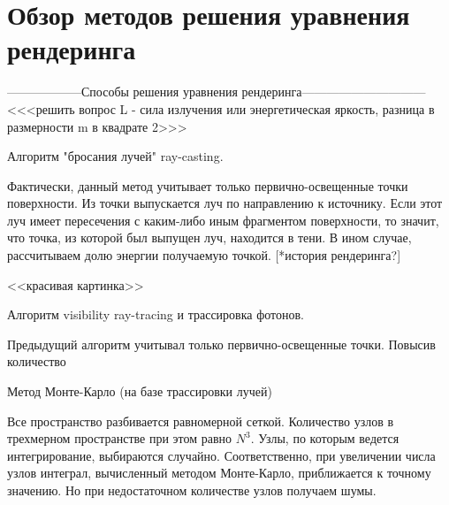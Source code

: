 \section*{Обзор методов решения уравнения рендеринга} 


------------------Способы решения уравнения рендеринга------------------------------
<<<решить вопрос L - сила излучения или энергетическая яркость, разница в размерности m в квадрате 2>>>


Алгоритм "бросания лучей" ray-casting.

Фактически, данный метод учитывает только первично-освещенные точки поверхности. Из точки выпускается луч по направлению к источнику. Если этот луч имеет пересечения с каким-либо иным фрагментом поверхности, то значит, что точка, из которой был выпущен луч, находится в тени. В ином случае, рассчитываем долю энергии получаемую точкой. [*история рендеринга?]

<<красивая картинка>>


Алгоритм visibility ray-tracing и трассировка фотонов.

Предыдущий алгоритм учитывал только первично-освещенные точки. Повысив количество 



Метод Монте-Карло (на базе трассировки лучей)

Все пространство разбивается равномерной сеткой. Количество узлов в трехмерном пространстве при этом равно $N^3$. Узлы, по которым ведется интегрирование, выбираются случайно. Соответственно, при увеличении числа узлов интеграл, вычисленный методом Монте-Карло, приближается к точному значению. Но при недостаточном количестве узлов получаем шумы. 
